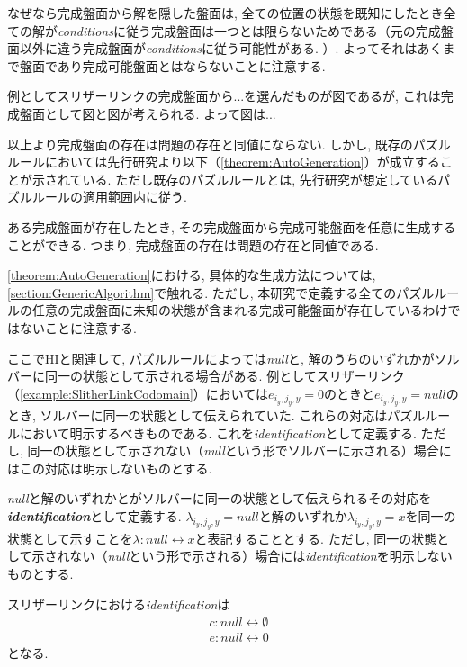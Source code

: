 なぜなら完成盤面から解を隠した盤面は, 全ての位置の状態を既知にしたとき全ての解が\textit{conditions}に従う完成盤面は一つとは限らないためである（元の完成盤面以外に違う完成盤面が\textit{conditions}に従う可能性がある. ）. よってそれはあくまで盤面であり完成可能盤面とはならないことに注意する.
\begin{example}
  例としてスリザーリンクの完成盤面から...を選んだものが図であるが, これは完成盤面として図と図が考えられる. よって図は...
\end{example}
以上より完成盤面の存在は問題の存在と同値にならない. しかし, 既存のパズルルールにおいては先行研究\cite{Fujiwara2022}より以下（\cref{theorem:AutoGeneration}）が成立することが示されている. ただし既存のパズルルールとは, 先行研究\cite{Fujiwara2022}が想定しているパズルルールの適用範囲内に従う.
\begin{theorem}\label{theorem:AutoGeneration}
  ある完成盤面が存在したとき, その完成盤面から完成可能盤面を任意に生成することができる. つまり, 完成盤面の存在は問題の存在と同値である.
\end{theorem}
\cref{theorem:AutoGeneration}における, 具体的な生成方法については, \cref{section:GenericAlgorithm}で触れる. ただし, 本研究で定義する全てのパズルルールの任意の完成盤面に未知の状態が含まれる完成可能盤面が存在しているわけではないことに注意する.

ここでHIと関連して, パズルルールによっては\textit{null}と, 解のうちのいずれかがソルバーに同一の状態として示される場合がある. 例としてスリザーリンク（\cref{example:SlitherLinkCodomain}）においては$e_{i_y,j_y,y} = 0$のときと$e_{i_y,j_y,y}=\textit{null}$のとき, ソルバーに同一の状態として伝えられていた. これらの対応はパズルルールにおいて明示するべきものである. これを\textit{identification}として定義する. ただし, 同一の状態として示されない（\textit{null}という形でソルバーに示される）場合にはこの対応は明示しないものとする.

\begin{definition}\label{definition:Identification}
  \textit{null}と解のいずれかとがソルバーに同一の状態として伝えられるその対応を\textbf{\textit{identification}}として定義する.
  $\lambda_{i_y,j_y,y}=\textit{null}$と解のいずれか$\lambda_{i_y,j_y,y}=x$を同一の状態として示すことを$\lambda\colon\textit{null}\leftrightarrow x$と表記することとする.
  ただし, 同一の状態として示されない（\textit{null}という形で示される）場合には\textit{identification}を明示しないものとする.
\end{definition}

\begin{example}\label{example:SlitherLinkIndentification}
  スリザーリンクにおける\textit{identification}は
  \begin{align}
     & c\colon\textit{null}\leftrightarrow\emptyset \\
     & e\colon\textit{null}\leftrightarrow 0
  \end{align}
  となる.
\end{example}


